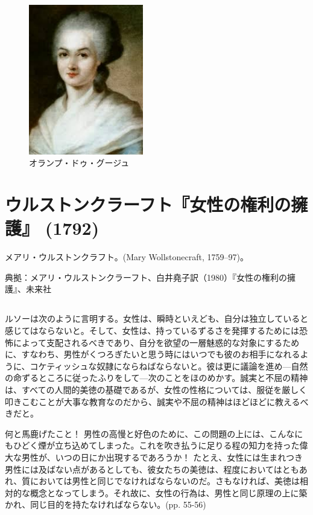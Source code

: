  \begin{figure}[htbp]
   \centering
     \includegraphics[width=50mm]{images/gouges.jpg}
   \caption{オランプ・ドゥ・グージュ}
 \end{figure}








\section{ウルストンクラーフト『女性の権利の擁護』 (1792)}


メアリ・ウルストンクラフト。(Mary Wollstonecraft, 1759--97)。

典拠：メアリ・ウルストンクラーフト、白井堯子訳（1980）『女性の権利の擁護』、未来社



\subsection{}

  ルソーは次のように言明する。女性は、瞬時といえども、自分は独立していると感じてはならないと。そして、女性は、持っているずるさを発揮するためには恐怖によって支配されるべきであり、自分を欲望の一層魅惑的な対象にするために、すなわち、男性がくつろぎたいと思う時にはいつでも彼のお相手になれるように、コケティッシュな奴隷にならねばならないと。彼は更に議論を進め{\——}自然の命ずるところに従ったふりをして{\——}次のことをほのめかす。誠実と不屈の精神は、すべての人間的美徳の基礎であるが、女性の性格については、服従を厳しく叩きこむことが大事な教育なのだから、誠実や不屈の精神はほどほどに教えるべきだと。

  何と馬鹿げたこと！ 男性の高慢と好色のために、この問題の上には、こんなにもひどく煙が立ち込めてしまった。これを吹き払うに足りる程の知力を持った偉大な男性が、いつの日にか出現するであろうか！ たとえ、女性には生まれつき男性には及ばない点があるとしても、彼女たちの美徳は、程度においてはともあれ、質においては男性と同じでなければならないのだ。さもなければ、美徳は相対的な概念となってしまう。それ故に、女性の行為は、男性と同じ原理の上に築かれ、同じ目的を持たなければならない。(pp. 55-56)


